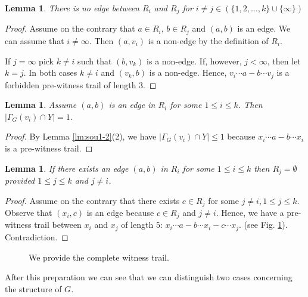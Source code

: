 \documentclass[11pt]{elsarticle}
\theoremstyle{plain}
\newtheorem{lemma}[theorem]{Lemma}
\theoremstyle{definition}
\begin{document}
\begin{lemma}\label{lm:RiRj_free}
There is no edge between $R_i$ and $R_j$ for $i\ne j \in (\{1,2,\dots,k \}\cup\{\infty\})$
\end{lemma}
\begin{proof}
Assume on the contrary that $a\in R_i$, $b\in R_j$ and $(a,b)$ is an edge.
We can assume that $i\ne \infty$.
Then $(a,v_i)$ is a non-edge by the definition of $R_i$.

If $j=\infty $ pick $k\ne i$ such that $(b,v_k)$ is a non-edge. If, however, $j<\infty$, then let $k=j$. In both cases $k\ne i$ and $(v_k,b)$ is a non-edge. Hence, $v_i\cdots a-b\cdots v_j$ is a forbidden pre-witness trail of  length $3$.
\end{proof}

\begin{lemma}\label{lm:Ysingleton}
Assume  $(a,b)$ is an edge in $R_i$   for some $1\le i\le k$. Then $|\Gamma_G(v_i)\cap Y|=1$.
\end{lemma}

\begin{proof}
By Lemma \ref{lm:sou1-2}(2), we have  $|\Gamma_G(v_i)\cap Y|\le 1$ because $x_i\cdots a-b\cdots x_i$ is a pre-witness trail.
\end{proof}

\begin{lemma}\label{lm:Ri-empty}
If there exists an edge $(a,b)$ in $R_i$  for some  $1\le i\le k$ then  $R_j=\emptyset$  provided  $1\le j\le k$ and $ j\ne i$.
\end{lemma}

\begin{proof}
Assume on the contrary that there exists $c\in R_j$ for some  $j\ne i, 1\le j \le k.$ Observe that $(x_i,c)$ is an edge because $c\in R_j$ and $j\ne i$. Hence,  we have a pre-witness trail between $x_i$ and $x_j$ of length $5$: $x_i\cdots a-b\cdots x_i-c\cdots x_j$.  (see Fig. \ref{fig}). Contradiction.
\end{proof}

\begin{figure}[h]
\begin{center}
\end{center}
\caption{We provide the complete witness trail.}\label{fig}
\end{figure}
\medskip\noindent
After this preparation we can see that
we can distinguish two cases concerning the structure of $G$.
\end{document}
